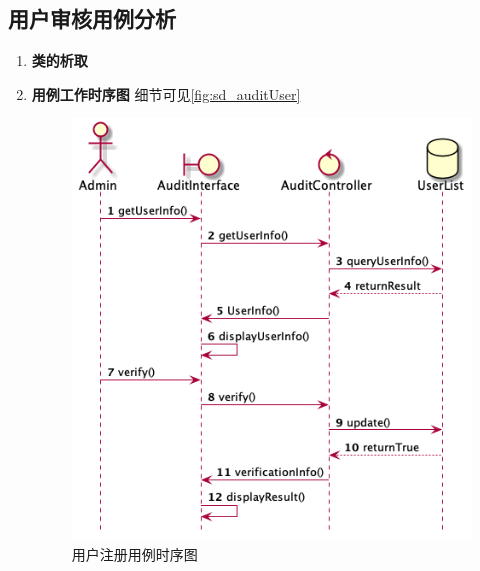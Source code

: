 	\subsection{用户审核用例分析} %
	\label{sub:用户审核用例分析}
	\begin{enumerate}
		\item \textbf{类的析取}

		\item \textbf{用例工作时序图}
		细节可见\autoref{fig:sd_auditUser}

		\begin{figure}[htp]
		    \centering
		    \includegraphics[width=12cm]{figure/sequenceDiagram/sd_audit_user.png}
		    \caption{用户注册用例时序图}
		    \label{fig:sd_auditUser}
		\end{figure}

	\end{enumerate}

